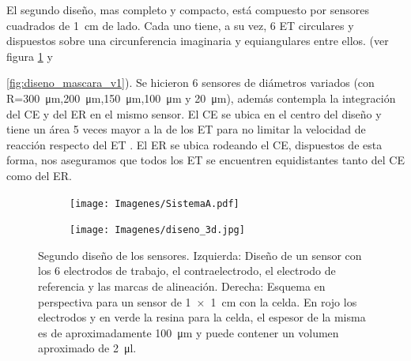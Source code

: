 		 El segundo diseño, mas completo y compacto, está compuesto por sensores cuadrados de \SI{1}{\cm} de lado. Cada uno tiene, a su vez, 6 ET circulares y dispuestos sobre una circunferencia imaginaria y equiangulares entre ellos. (ver figura \ref{fig:mascara_diseno_v2} y {\ref{fig:diseno_mascara_v1}). Se hicieron 6 sensores de diámetros variados (con R=\SI{300}{\um},\SI{200}{\um},\SI{150}{\um},\SI{100}{\um} y \SI{20}{\um}), además contempla la integración del CE y del ER en el mismo sensor. El CE se ubica en el centro del diseño y tiene un área 5 veces mayor a la de los ET para no limitar la velocidad de reacción respecto del ET \cite{Wi2000}. El ER se ubica rodeando el CE, dispuestos de esta forma, nos aseguramos que todos los ET se encuentren equidistantes tanto del CE como del ER.

						\begin{figure}[th!]
			 	   	    \begin{subfigure}[t]{0.395\textwidth}
			        	\texttt{[image: Imagenes/SistemaA.pdf]}
			    		\end{subfigure}
						\begin{subfigure}[t]{0.595\textwidth}
			     		\texttt{[image: Imagenes/diseno\_3d.jpg]}
			        	\end{subfigure}
			     		\caption[Segundo diseño y máscara de los sensores]{Segundo diseño de los sensores. Izquierda: Diseño de un sensor con los 6 electrodos de trabajo, el contraelectrodo, el electrodo de referencia y las marcas de alineación. Derecha: Esquema en perspectiva para un sensor de \SI{1x1}{\cm} con la celda. En rojo los electrodos y en verde la resina para la celda, el espesor de la misma es de aproximadamente \SI{100}{\um} y puede contener un volumen aproximado de \SI{2}{\ul}.}
			     		\label{fig:mascara_diseno_v2}
			     		\end{figure}

}
